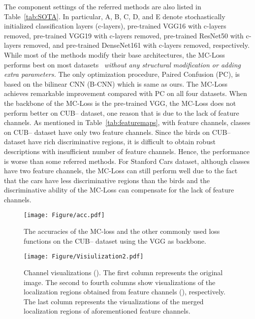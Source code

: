 \documentclass[journal]{IEEEtran}
\begin{document}
The component settings of the referred methods are also listed in Table~\ref{tab:SOTA}. In particular, A, B, C, D, and E denote stochastically initialized  classification layers (c-layers), pre-trained VGG16 with c-layers removed, pre-trained VGG19 with c-layers removed, pre-trained ResNet50 with c-layers removed, and pre-trained DenseNet161 with c-layers removed, respectively. While most of the methods modify their base architectures, the MC-Loss performs best on most datasets ~\emph{without any structural modification or adding extra parameters.} The only optimization procedure, Paired Confusion (PC), is based on the bilinear CNN (B-CNN) which is same as ours. The MC-Loss achieves remarkable improvement compared with PC on all four datasets. When the backbone of the MC-Loss is the pre-trained VGG, the MC-Loss does not perform better on  CUB-- dataset,  one reason that  is due to the lack of feature channels. As mentioned in Table~\ref{tab:featuremaps}, with  feature channels,  classes on  CUB-- dataset have only two feature channels.  Since the birds on  CUB-- dataset have rich discriminative regions, it is difficult to obtain robust descriptions with insufficient number of feature channels. Hence, the performance is worse than some referred methods. For Stanford Cars dataset, although  classes have two feature channels, the MC-Loss can still perform well due to the fact that the cars have less discriminative regions than the birds and the discriminative ability of the MC-Loss can compensate for the lack of feature channels. 



\begin{figure*}[!t]
    \begin{center}
\texttt{[image: Figure/acc.pdf]}

\end{center}
      \vspace{-5mm}
    \caption{The accuracies of the MC-loss and the other commonly used loss functions on the CUB-- dataset using the VGG as backbone.}
    \label{fig:acc_MC2}
      \vspace{-5mm}
\end{figure*}



\begin{figure*}[!t]
    \begin{center}
\texttt{[image: Figure/Visiulization2.pdf]}

\end{center}
    \vspace{-5mm}
    \caption{Channel visualizations ().  The first column represents the original image. The second to fourth columns show visualizations of the localization regions obtained from  feature channels (), respectively. The last column represents the visualizations of the merged localization regions of  aforementioned feature channels.}
    \label{fig:visualization_MC}
      \vspace{-5mm}
\end{figure*}
\end{document}
